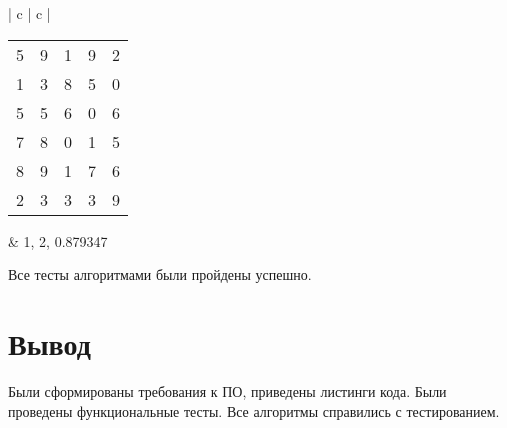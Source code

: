 \begin{table}[h]
\begin{tabular}{| c | c |}
		\begin{tabular}{c c c c c} 
			5 & 9 & 1 & 9 & 2  \\
			1 & 3 & 8 & 5 & 0 \\
			5 & 5 & 6 & 0 & 6 \\
			7 & 8 & 0 & 1 & 5 \\
			8 & 9 & 1 & 7 & 6 \\
			2 & 3 & 3 & 3 & 9 \\
		\end{tabular}
		&
		1, 2, 0.879347 \\
		\hline
		\end{tabular}
\end{table}
\FloatBarrier

Все тесты алгоритмами были пройдены успешно.

\section{Вывод}
Были сформированы требования к ПО, приведены листинги кода.
Были проведены функциональные тесты.
Все алгоритмы справились с тестированием.